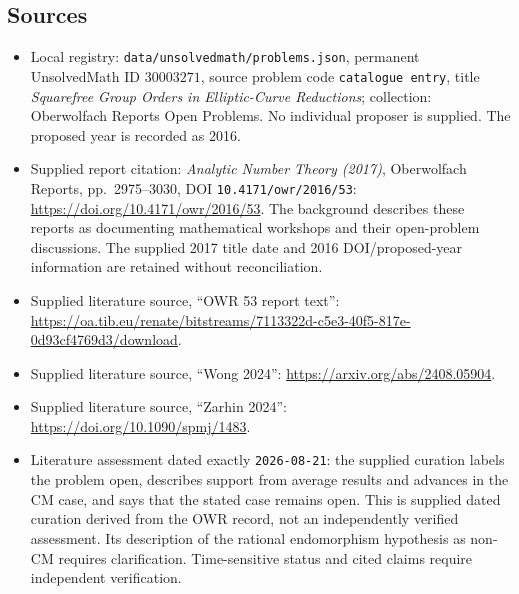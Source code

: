 \documentclass[11pt]{article}
\begin{document}
\subsection{Sources}
\begin{itemize}
\item Local registry: \texttt{data/unsolvedmath/problems.json}, permanent UnsolvedMath ID \(30003271\), source problem code \texttt{catalogue entry}, title \emph{Squarefree Group Orders in Elliptic-Curve Reductions}; collection: Oberwolfach Reports Open Problems. No individual proposer is supplied. The proposed year is recorded as 2016.
\item Supplied report citation: \emph{Analytic Number Theory (2017)}, Oberwolfach Reports, pp.\ 2975--3030, DOI \texttt{10.4171/owr/2016/53}: \url{https://doi.org/10.4171/owr/2016/53}. The background describes these reports as documenting mathematical workshops and their open-problem discussions. The supplied 2017 title date and 2016 DOI/proposed-year information are retained without reconciliation.
\item Supplied literature source, ``OWR 53 report text'': \url{https://oa.tib.eu/renate/bitstreams/7113322d-c5e3-40f5-817e-0d93cf4769d3/download}.
\item Supplied literature source, ``Wong 2024'': \url{https://arxiv.org/abs/2408.05904}.
\item Supplied literature source, ``Zarhin 2024'': \url{https://doi.org/10.1090/spmj/1483}.
\item Literature assessment dated exactly \texttt{2026-08-21}: the supplied curation labels the problem open, describes support from average results and advances in the CM case, and says that the stated case remains open. This is supplied dated curation derived from the OWR record, not an independently verified assessment. Its description of the rational endomorphism hypothesis as non-CM requires clarification. Time-sensitive status and cited claims require independent verification.
\end{itemize}
\end{document}

